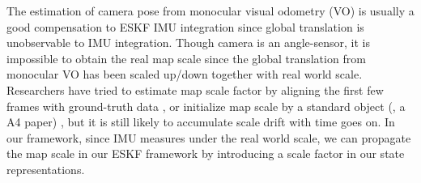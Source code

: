 The estimation of camera pose from monocular visual odometry (VO) is usually a good compensation to ESKF IMU integration since global translation is unobservable to IMU integration. Though camera is an angle-sensor, it is impossible to obtain the real map scale \cite{forster2014svo} since the global translation from monocular VO has been scaled up/down together with real world scale. Researchers have tried to estimate map scale factor by aligning the first few frames with ground-truth data \cite{forster2014svo}, or initialize map scale by a standard object (\eg, a A4 paper) \cite{davison2007monoslam}, but it is still likely to accumulate scale drift with time goes on. In our framework, since IMU measures under the real world scale, we can propagate the map scale in our ESKF framework by introducing a scale factor in our state representations. 

